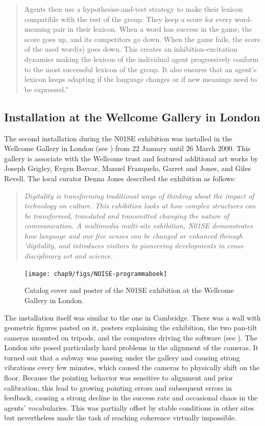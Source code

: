 \begin{quotation}
Agents then use a hypothesise-and-test strategy to make their lexicon compatible with the rest of the group. They keep a score for every word-meaning pair in their lexicon. When a word has success in the game, the score goes up, and its competitors go down. When the game fails, the score of the used word(s) goes down. This creates an inhibition-excitation dynamics making the lexicon of the individual agent progressively conform to the most successful lexicon of the group. It also ensures that an agent's lexicon keeps adapting if the language changes or if new meanings need to be expressed."
\end{quotation}

\subsection{Installation at the Wellcome Gallery in London} 

The second installation during the N01SE exhibition was installed in the Wellcome Gallery in London 
(see ) 
from 22 January until 26 March 2000. This gallery is associate with the Wellcome trust and featured additional 
art works by Joseph Grigley, Evgen Bavcar, Manuel Franquelo, Garret and Jones, and Giles Revell. The local curator
Denna Jones described the exhibition as follows: 

\begin{quotation}
{\itshape Digitality is transforming traditional ways of thinking about the impact of technology on culture. This exhibition 
looks at how complex structures can be transformed, translated and transmitted changing the nature of communication. 
A multimedia multi-site exhibition, N01SE demonstrates how language and our five senses can be changed or 
enhanced through `digitality, and introduces visitors to pioneering developments in cross-disciplinary art and 
science.}
\end{quotation}

\begin{figure}[htbp]
  \centerline{\texttt{[image: chap9/figs/NOISE-programmaboek]}}
\caption{\label{fig:program} 
Catalog cover and poster of the N01SE exhibition at the Wellcome Gallery in London.}
\end{figure}

The installation itself was similar to the one in Cambridge. There was a wall with 
geometric figures pasted on it, posters explaining the exhibition, the two pan-tilt cameras mounted on tripods, 
and the computers driving the software (see ). The London site posed particularly hard 
problems in the alignment of the cameras. 
It turned out that a subway was passing under the gallery and causing strong vibrations 
every few minutes, which caused the cameras to physically shift on the floor. Because the pointing behavior was sensitive 
to alignment and prior calibration, this lead to growing pointing errors and 
subsequent errors in feedback, causing a strong decline in 
the success rate and occasional chaos in the agents' vocabularies. This was partially offset by stable conditions in 
other sites but nevertheless made the task of reaching coherence virtually impossible. 

